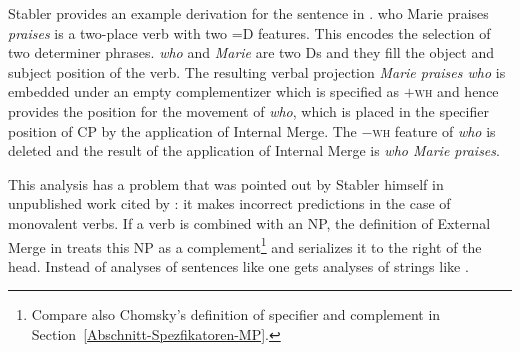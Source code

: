 Stabler provides an example derivation for the sentence in .
\ea
who Marie praises
\z
\emph{praises} is a two-place verb with two =D features. This encodes the selection of two determiner
phrases. \emph{who} and \emph{Marie} are two Ds and they fill the object and subject position of the
verb. The resulting verbal projection \emph{Marie praises who} is embedded under an empty complementizer which is specified
as $+$\textsc{wh} and hence provides the position for the movement of \emph{who}, which is placed in the
specifier position of CP by the application of Internal Merge. The $-$\textsc{wh} feature of \emph{who}
is deleted and the result of the application of Internal Merge is \emph{who Marie praises}.

This\label{Seite-leeres-Objekt} analysis has a problem that was pointed out by Stabler himself in unpublished work cited by
\citet[]{Veenstra98a}: it makes incorrect predictions in the case of monovalent verbs. If
a verb is combined with an NP, the definition of External Merge in 
treats this NP as a complement\footnote{%
Compare also Chomsky's definition of specifier and complement in Section~\ref{Abschnitt-Spezfikatoren-MP}.
} and serializes it to the right of the head. Instead of analyses of sentences like  one
gets analyses of strings like .

